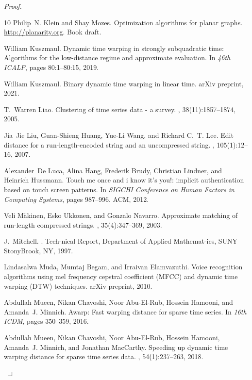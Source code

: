 \documentclass[a4paper,UKenglish,cleveref, autoref, thm-restate]{lipics-v2021}
\begin{document}
\begin{proof}
\begin{thebibliography}{10}
Philip~N. Klein and Shay Mozes.
\newblock Optimization algorithms for planar graphs.
\newblock \url{http://planarity.org}.
\newblock Book draft.

William Kuszmaul.
\newblock Dynamic time warping in strongly subquadratic time: Algorithms for
  the low-distance regime and approximate evaluation.
\newblock In {\em 46th {ICALP}}, pages 80:1--80:15,
  2019.

William Kuszmaul.
\newblock Binary dynamic time warping in linear time.
\newblock arXiv preprint, 2021.

T.~Warren Liao.
\newblock Clustering of time series data - a survey.
, 38(11):1857--1874, 2005.

Jia~Jie Liu, Guan-Shieng Huang, Yue-Li Wang, and Richard C.~T. Lee.
\newblock Edit distance for a run-length-encoded string and an uncompressed
  string.
, 105(1):12--16, 2007.

Alexander~De Luca, Alina Hang, Frederik Brudy, Christian Lindner, and Heinrich
  Hussmann.
\newblock Touch me once and i know it's you!: implicit authentication based on
  touch screen patterns.
\newblock In {\em SIGCHI Conference on Human Factors in Computing Systems},
  pages 987--996. ACM, 2012.

Veli M{\"a}kinen, Esko Ukkonen, and Gonzalo Navarro.
\newblock Approximate matching of run-length compressed strings.
, 35(4):347--369, 2003.

J.~Mitchell.
.
\newblock Tech-nical Report, Department of Applied Mathemat-ics, SUNY
  StonyBrook, NY, 1997.

Lindasalwa Muda, Mumtaj Begam, and Irraivan Elamvazuthi.
\newblock Voice recognition algorithms using mel frequency cepstral coefficient
  ({MFCC}) and dynamic time warping ({DTW}) techniques.
\newblock arXiv preprint, 2010.

Abdullah Mueen, Nikan Chavoshi, Noor Abu{-}El{-}Rub, Hossein Hamooni, and
  Amanda~J. Minnich.
\newblock Awarp: Fast warping distance for sparse time series.
\newblock In {\em 16th {ICDM}}, pages 350--359, 2016.

Abdullah Mueen, Nikan Chavoshi, Noor Abu{-}El{-}Rub, Hossein Hamooni, Amanda~J.
  Minnich, and Jonathan MacCarthy.
\newblock Speeding up dynamic time warping distance for sparse time series
  data.
, 54(1):237--263, 2018.


\end{thebibliography}
\end{proof}
\end{document}
